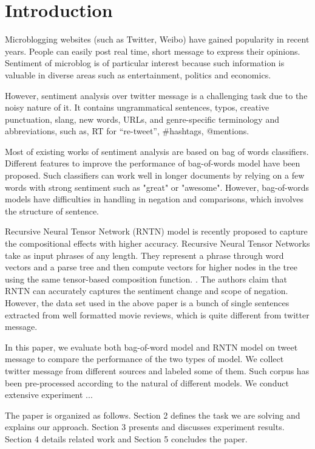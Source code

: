 \section{Introduction}

Microblogging websites (such as Twitter, Weibo) have gained popularity in recent years. People can easily post real time, short message to express their opinions. 
Sentiment of microblog is of particular interest because such information is valuable in diverse areas such as entertainment, politics and economics.

However, sentiment analysis over twitter message is a challenging task due to the noisy nature of it. 
It contains ungrammatical sentences, typos, creative punctuation, slang, new words, URLs, and genre-specific terminology and abbreviations, such as, RT for “re-tweet”, \#hashtags, @mentions. 

Most of existing works of sentiment analysis are based on bag of words classifiers. Different features to improve the performance of bag-of-words model have been proposed\cite{Agarwal:2011}. Such classifiers can work well in longer documents by relying on a few words with strong sentiment such as "great" or "awesome". However, bag-of-words models have difficulties in handling in negation and comparisons, which involves the structure of sentence. 

Recursive Neural Tensor Network (RNTN) model is recently proposed to capture the compositional effects with higher accuracy. Recursive Neural Tensor Networks take as input phrases of any length. They represent a phrase through word vectors and a parse tree and then compute vectors for higher nodes in the tree using the same tensor-based composition function. \cite{Socher:2013}. The authors claim that RNTN can accurately captures the sentiment change and scope of negation. However, the data set used in the above paper is a bunch of single sentences extracted from well formatted movie reviews, which is quite different from twitter message. 

In this paper, we evaluate both bag-of-word model and RNTN model on tweet message to compare the performance of the two types of model. We collect twitter message from different sources and labeled some of them. Such corpus has been pre-processed according to the natural of different models. We conduct extensive experiment ...

The paper is organized as follows. Section 2 defines the task we are solving and explains our approach. 
Section 3 presents and discusses experiment results. Section 4 details related work and Section 5 concludes the paper.
\newpage